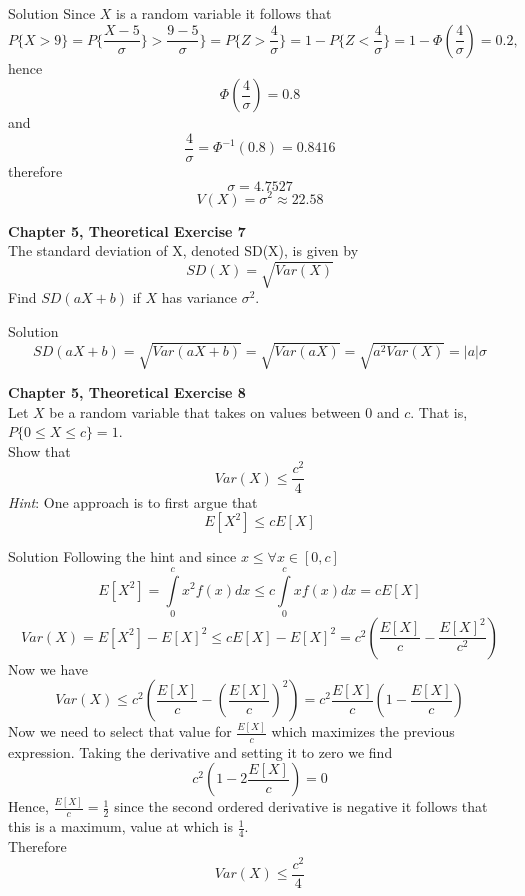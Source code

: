 \documentclass{article}
\begin{document}
\begin{spacing}{1.1}
\begin{homeworkProblem}
  \begin{homeworkSection}{Solution}
  Since $X$ is a random variable it follows that 
    \[ P\{ X > 9\} = P\{ \frac{ X - 5}{ \sigma}\} > \frac{ 9 - 5}{ \sigma}\}
    = P\{ Z > \frac{ 4}{ \sigma}\} = 1 - P\{ Z < \frac{ 4}{ \sigma}\}
    = 1 - \Phi\left( \frac{ 4}{ \sigma}\right) = 0.2,\]
    hence
    \[\Phi\left( \frac{ 4}{ \sigma} \right) = 0.8\]
    and
    \[\frac{ 4}{ \sigma} = \Phi^{-1}(0.8) = 0.8416\]
    therefore
    \[\sigma = 4.7527\]
    \[V( X) = \sigma^2 \approx 22.58\]

  \end{homeworkSection}
\end{homeworkProblem}

\newpage
\begin{homeworkProblem}
  {\bf Chapter 5, Theoretical Exercise 7}\\
  The standard deviation of X, denoted SD(X), is
  given by
      \[SD( X) = \sqrt{ Var(X)}\]
  Find $SD( aX + b)$ if $X$ has variance $\sigma^2$.

  \begin{homeworkSection}{Solution}
    \[SD( aX + b) = \sqrt{ Var( a X + b)} = \sqrt{ Var( a X)} = \sqrt{ a^2 Var( X)} = |a| \sigma\]

  \end{homeworkSection}
\end{homeworkProblem}
  
\newpage
\begin{homeworkProblem}
  {\bf Chapter 5, Theoretical Exercise 8}\\
  Let $X$ be a random variable that takes on values 
  between $0$ and $c$.  That is, $P\{ 0 \le X \le c\} = 1$.
  \\Show that
    \[Var( X) \le \frac{ c^2}{ 4}\]
  \emph{Hint}: One approach is to first argue that
    \[E[ X^2] \le c E[ X]\]

  \begin{homeworkSection}{Solution}
    Following the hint and since $x \le \forall x \in [0, c]$
    \[E[ X^2] = \int\limits_0^c x^2 f( x) dx \le c \int\limits_0^c x f( x) dx = c E[ X]\]
    \[Var( X) = E[ X^2] - E[ X]^2 \le c E[ X] - E[ X]^2 
    = c ^2 \left(\frac{ E[ X]}{ c} - \frac{ E[ X]^2}{ c^2}\right)\]
    Now we have
    \[Var(X) \le c^2 \left(\frac{ E[X]}{ c} - \left(\frac{ E[X]}{ c}\right)^2\right) 
    = c^2 \frac{ E[X]}{ c} \left(1 - \frac{ E[X]}{ c}\right)\]
    Now we need to select that value for $\frac{ E[X]}{ c}$ which maximizes the previous
    expression.  Taking the derivative and setting it to zero we find
      \[c^2 \left(1 - 2 \frac{ E[X]}{ c}\right) = 0\]
    Hence, $\frac{ E[X]}{ c} = \frac{ 1}{ 2}$ since the second ordered derivative is
    negative it follows that this is a maximum, value at which is $\frac{ 1}{ 4}$.
    \\Therefore
      \[Var( X) \le \frac{ c^2}{ 4}\]

  \end{homeworkSection}
\end{homeworkProblem}
\end{spacing}
\end{document}

